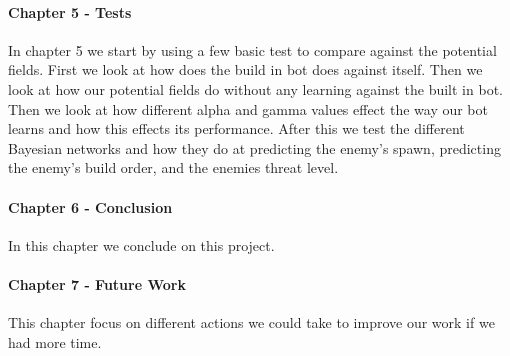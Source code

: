 \paragraph*{Chapter 5 - Tests}
In chapter 5 we start by using a few basic test to compare against the potential fields. First we look at how does the build in bot does against itself. Then we look at how our potential fields do without any learning against the built in bot. Then we look at how different alpha and gamma values effect the way our bot learns and how this effects its performance. After this we test the different Bayesian networks and how they do at predicting the enemy's spawn, predicting the enemy's build order, and the enemies threat level.

\paragraph*{Chapter 6 - Conclusion}
In this chapter we conclude on this project.

\paragraph*{Chapter 7 - Future Work}
This chapter focus on different actions we could take to improve our work if we had more time.
